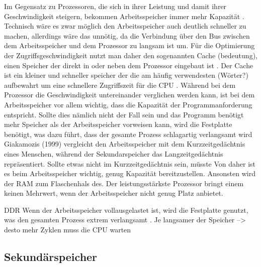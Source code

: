 Im Gegensatz zu Prozessoren, die sich in ihrer Leistung und damit ihrer Geschwindigkeit steigern, bekommen Arbeitsspeicher immer mehr Kapazität \cite{tanenbaum}. Technisch wäre es zwar möglich den Arbeitsspeicher auch deutlich schneller zu machen, allerdings wäre das unnötig, da die Verbindung über den Bus zwischen dem Arbeitsspeicher und dem Prozessor zu langsam ist um. Für die Optimierung der Zugriffsgeschwindigkeit nutzt man daher den sogenannten Cache (bedeutung), einen Speicher der direkt in oder neben dem Prozessor eingebaut ist \cite{tanenbaum}. Der Cache ist ein kleiner und schneller speicher der die am häufig verwendesten (Wörter?) aufbewahrt um eine schnellere Zugriffszeit für die CPU \cite{tanenbaum}. 
Während bei dem Prozessor die Geschwindigkeit untereinander verglichen werden kann, ist bei dem Arbeitsspeicher vor allem wichtig, dass die Kapazität der Programmanforderung entspricht. Sollte dies nämlich nicht der Fall sein und das Programm benötigt mehr Speicher als der Arbeitsspeicher vorweisen kann, wird die Festplatte benötigt, was dazu führt, dass der gesamte Prozess schlagartig verlangsamt wird \cite{singh2016}  %
Giakamozis (1999) \cite{haugen2000} vergleicht den Arbeitsspeicher mit dem Kurzzeitgedächtnis eines Menschen, während der Sekundarspeicher das Langzeitgedächtnis repräsentiert. Sollte etwas nicht im Kurzzeitgedächtnis sein, müsste 
Von daher ist es beim Arbeitsspeicher wichtig, genug Kapazität bereitzustellen. Ansonsten wird der RAM zum Flaschenhals des. Der leistungsstärkste Prozessor bringt einem keinen Mehrwert, wenn der Arbeitsspeicher nicht genug Platz anbietet.

DDR
Wenn der Arbeitsspeicher vollausgelastet ist, wird die Festplatte genutzt, was den gesamten Prozess extrem verlangsamt \cite{singh2016}.
Je langsamer der Speicher --> desto mehr Zyklen muss die CPU warten \cite{tanenbaum}




\subsection{Sekundärspeicher}
\label{subsec:hdd}

